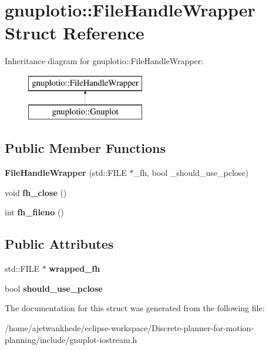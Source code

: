 \hypertarget{structgnuplotio_1_1FileHandleWrapper}{}\section{gnuplotio\+:\+:File\+Handle\+Wrapper Struct Reference}
\label{structgnuplotio_1_1FileHandleWrapper}
Inheritance diagram for gnuplotio\+:\+:File\+Handle\+Wrapper\+:\begin{figure}[H]
\begin{center}
\leavevmode
\includegraphics[height=2.000000cm]{structgnuplotio_1_1FileHandleWrapper}
\end{center}
\end{figure}
\subsection*{Public Member Functions}
\begin{DoxyCompactItemize}
\item 
\mbox{\label{structgnuplotio_1_1FileHandleWrapper_a26b2378e193a9c41be5aed97e11f9411}} 
{\bfseries File\+Handle\+Wrapper} (std\+::\+F\+I\+LE $\ast$\+\_\+fh, bool \+\_\+should\+\_\+use\+\_\+pclose)
\item 
\mbox{\label{structgnuplotio_1_1FileHandleWrapper_acafac45efd9c78ce621af4f3228c6f67}} 
void {\bfseries fh\+\_\+close} ()
\item 
\mbox{\label{structgnuplotio_1_1FileHandleWrapper_a3202ccd15d624f26dd2cf699d3456de6}} 
int {\bfseries fh\+\_\+fileno} ()
\end{DoxyCompactItemize}
\subsection*{Public Attributes}
\begin{DoxyCompactItemize}
\item 
\mbox{\label{structgnuplotio_1_1FileHandleWrapper_adcb58bfcd9dbdba000a7e7395bee2ef9}} 
std\+::\+F\+I\+LE $\ast$ {\bfseries wrapped\+\_\+fh}
\item 
\mbox{\label{structgnuplotio_1_1FileHandleWrapper_a11b63ed64cf53167e26c5273778d90ea}} 
bool {\bfseries should\+\_\+use\+\_\+pclose}
\end{DoxyCompactItemize}


The documentation for this struct was generated from the following file\+:\begin{DoxyCompactItemize}
\item 
/home/ajetwankhede/eclipse-\/workspace/\+Discrete-\/planner-\/for-\/motion-\/planning/include/gnuplot-\/iostream.\+h\end{DoxyCompactItemize}
